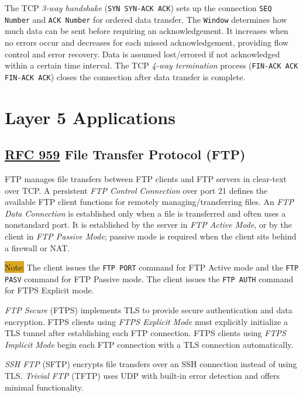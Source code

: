 \documentclass[12pt]{article}
\newcommand{\note}[1]{\colorbox{#1}{Note:}}
\newcommand{\RFC}[1]{\href{https://datatracker.ietf.org/doc/html/rfc#1}{RFC #1}}
\begin{document}
	The TCP \textit{3-way handshake} (\texttt{SYN SYN-ACK ACK}) sets up the connection \texttt{SEQ Number} and \texttt{ACK Number} for ordered data transfer. The \texttt{Window} determines how much data can be sent before requiring an acknowledgement. It increases when no errors occur and decreases for each missed acknowledgement, providing flow control and error recovery. Data is assumed lost/errored if not acknowledged within a certain time interval. The TCP \textit{4-way termination} process (\texttt{FIN-ACK ACK FIN-ACK ACK}) closes the connection after data transfer is complete.





\section{Layer 5 Applications \label{sec:L5}}

	\subsection[RFC 959 FTP]{\RFC{959} File Transfer Protocol (FTP) \label{subsec:FTP}}
	FTP manages file transfers between FTP clients and FTP servers in clear-text over TCP. A persistent \textit{FTP Control Connection} over port 21 defines the available FTP client functions for remotely managing/transferring files. An \textit{FTP Data Connection} is established only when a file is transferred and often uses a nonstandard port. It is established by the server in \textit{FTP Active Mode}, or by the client in \textit{FTP Passive Mode}; passive mode is required when the client sits behind a firewall or NAT.

	\note{Goldenrod} The client issues the \texttt{FTP PORT} command for FTP Active mode and the \texttt{FTP PASV} command for FTP Passive mode. The client issues the \texttt{FTP AUTH} command for FTPS Explicit mode.

	\textit{FTP Secure} (FTPS) implements TLS to provide secure authentication and data encryption. FTPS clients using \textit{FTPS Explicit Mode} must explicitly initialize a TLS tunnel after establishing each FTP connection. FTPS clients using \textit{FTPS Implicit Mode} begin each FTP connection with a TLS connection automatically.

	\textit{SSH FTP} (SFTP) encrypts file transfers over an SSH connection instead of using TLS. \textit{Trivial FTP} (TFTP) uses UDP with built-in error detection and offers minimal functionality.
\end{document}
